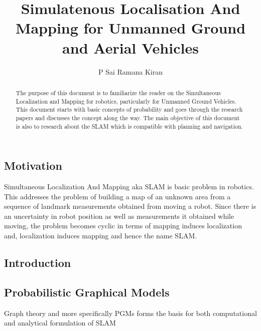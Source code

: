 \documentclass[]{report}
\title{Simulatenous Localisation And Mapping for Unmanned Ground and Aerial Vehicles}
\author{P Sai Ramana Kiran}
\begin{document}
\maketitle

\begin{abstract}
	The purpose of this document is to familiarize the reader on the Simultaneous Localization and Mapping for robotics, particularly for Unmanned Ground Vehicles. This document starts with basic concepts of probability and goes through the research papers and discusses the concept along the way. 
	The main objective of this document is also to research about the SLAM which is compatible with planning and navigation. 
\end{abstract}

\newpage

\begin{center}{\section*{Motivation}}\end{center}

Simultaneous Localization And Mapping aka SLAM is basic problem in robotics. This addresses the problem of building a map of an unknown area from a sequence of landmark measurements obtained from moving a robot. Since there is an uncertainty in robot position as well as measurements it obtained while moving, the problem becomes cyclic in terms of mapping induces localization and, localization induces mapping and hence the name SLAM. 

\newpage
 \begin{center}
 	\section*{Introduction}
 \end{center}
\newpage
\tableofcontents
\newpage
\begin{center}
	\section*{Probabilistic Graphical Models}
\end{center}
 Graph theory and more specifically PGMs forms the basis for both computational and analytical formulation of SLAM
\newpage
 
\end{document}
